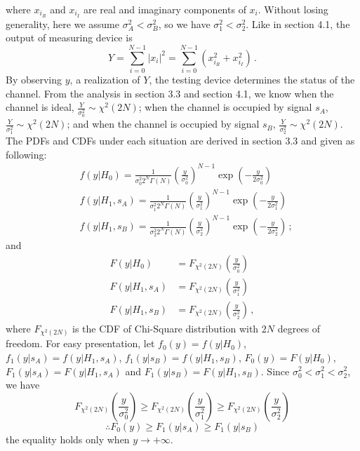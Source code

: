 where $x_{i_R}$ and $x_{i_I}$ are real and imaginary components of $x_i$. 
Without losing generality, here we assume $\sigma_A^2 < \sigma_B^2$, so we have $\sigma_1^2 < \sigma_2^2$. 
Like in section 4.1, the output of measuring device is
\begin{equation} 
  Y = \sum_{i=0}^{N-1}|x_i|^2 = \sum_{i=0}^{N-1}(x_{i_R}^2+x_{i_I}^2)\,.
  \label{equ: testing device2}
\end{equation}
By observing $y$, a realization of $Y$, the testing device determines the status of the channel. From the analysis in section 3.3 and section 4.1, we know when the channel is ideal, $\frac{Y}{\sigma_0^2} \sim \chi^2(2N)$; when the channel is occupied by signal $s_A$, $\frac{Y}{\sigma_1^2} \sim \chi^2(2N)$; and when the channel is occupied by signal $s_B$, $\frac{Y}{\sigma_2^2} \sim \chi^2(2N)$.  The PDFs and CDFs under each situation are derived in section 3.3 and given as following: 
\def \CHISQUY[#1]{\frac{1}{#1 2^N\Gamma(N)}\left(\frac{y}{#1}\right)^{N-1}\exp\left(-\frac{y}{2#1}\right)}
\begin{equation}
  \begin{split}
   &f(y|H_0) = \CHISQUY[\sigma_0^2]\\
  &f(y|H_1, s_A)=  \CHISQUY[\sigma_1^2]\\
  &f(y|H_1, s_B)=  \CHISQUY[\sigma_2^2]\,;
\end{split}
  \label{20150621a4}
\end{equation} 
and
\begin{equation}
  \begin{split}
    F(y|H_0) &= F_{\chi^2(2N)}(\frac{y}{\sigma_0^2})\\
    F(y|H_1, s_A) &= F_{\chi^2(2N)}(\frac{y}{\sigma_1^2})\\
    F(y|H_1, s_B) &= F_{\chi^2(2N)}(\frac{y}{\sigma_2^2})\,,
  \end{split}
\end{equation}
where $F_{\chi^2(2N)}$ is the CDF of Chi-Square distribution with $2N$ degrees of freedom. 
For easy presentation, let $f_0(y) = f(y|H_0)$, $f_1(y|s_A) = f(y|H_1, s_A)$, $f_1(y|s_B) = f(y|H_1, s_B)$, $F_0(y) = F(y|H_0)$, $F_1(y|s_A) = F(y|H_1, s_A)$ and $F_1(y|s_B) = F(y|H_1, s_B)$. 
Since $\sigma_0^2 < \sigma_1^2 < \sigma_2^2$, we have 
\begin{equation}
  F_{\chi^2(2N)}(\frac{y}{\sigma_0^2}) \geq F_{\chi^2(2N)}(\frac{y}{\sigma_1^2}) \geq  F_{\chi^2(2N)}(\frac{y}{\sigma_2^2})
  \label{20150701a0}
\end{equation}
\begin{equation} 
\therefore  F_0(y) \geq F_1(y|s_A) \geq F_1(y|s_B)
  \label{20150623a1}
\end{equation}
the equality holds only when $y \rightarrow +\infty$.


